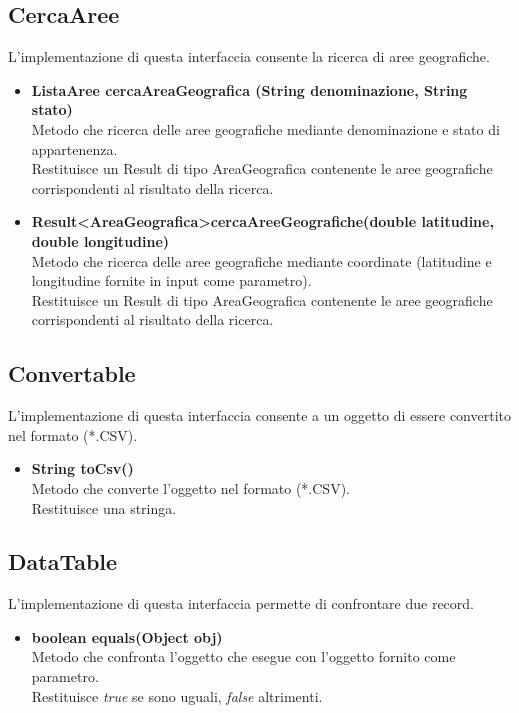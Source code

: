 \documentclass[a4paper, 12pt]{scrreprt}
\begin{document}
			\subsection{CercaAree}
			L'implementazione di questa interfaccia consente la ricerca di aree geografiche.
			\begin{itemize}
				\item \textbf{ListaAree cercaAreaGeografica (String denominazione, String stato)}
				\\Metodo che ricerca delle aree geografiche mediante denominazione e stato di appartenenza.
				\\Restituisce un Result di tipo AreaGeografica contenente le aree geografiche corrispondenti al risultato della ricerca.
				
				\item\textbf{Result\textless AreaGeografica\textgreater cercaAreeGeografiche(double latitudine, double longitudine)}
				\\Metodo che ricerca delle aree geografiche mediante coordinate (latitudine e longitudine fornite in input come parametro).
				\\Restituisce un Result di tipo AreaGeografica contenente le aree geografiche corrispondenti al risultato della ricerca.
			\end{itemize}

			\subsection{Convertable}
			L'implementazione di questa interfaccia consente a un oggetto di essere convertito nel formato (*.CSV).
			\begin{itemize}
				\item \textbf{String toCsv()}
				\\Metodo che converte l'oggetto nel formato (*.CSV).
				\\Restituisce una stringa.
			\end{itemize}
			\subsection{DataTable}
			L'implementazione di questa interfaccia permette di confrontare due record.
			\begin{itemize}
				\item\textbf{boolean equals(Object obj)}
				\\Metodo che confronta l'oggetto che esegue con l'oggetto fornito come parametro.
				\\Restituisce \textit{true} se sono uguali, \textit{false} altrimenti.
			\end{itemize}
\end{document}
